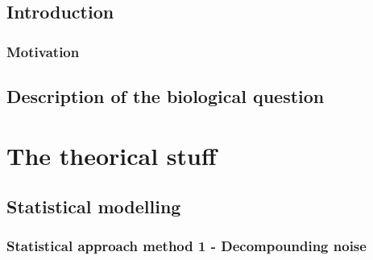 \documentclass[mainlanguage=french,fncychap=none, secnumdepth=paragraph]{yathesis}
\begin{document}



%
%
%

\maketitle[frametitle=none]

\makekeywords

\makelaboratory

\dedication{À Manue}
\dedication{À Garance}
\dedication{À mes parents}
\dedication{À Grégoire}




\makeabstract

\tableofcontents

%

\mainmatter






\chapter{Introduction}
    
\section{Motivation}

\chapter{Description of the biological question}
    

\part{The theorical stuff}
\chapter{Statistical modelling}
    \section{Statistical approach method 1 - Decompounding noise}
\end{document}
